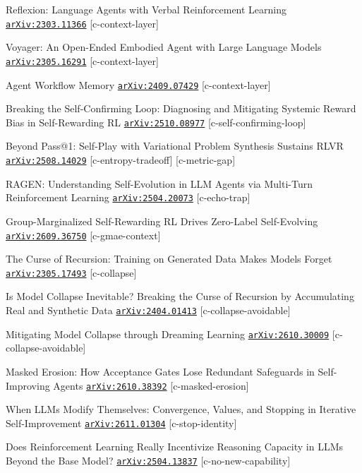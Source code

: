 \begin{refs}
[36] Reflexion: Language Agents with Verbal Reinforcement Learning \href{https://arxiv.org/abs/2303.11366}{\texttt{arXiv:2303.11366}} [c-context-layer]\par
[37] Voyager: An Open-Ended Embodied Agent with Large Language Models \href{https://arxiv.org/abs/2305.16291}{\texttt{arXiv:2305.16291}} [c-context-layer]\par
[38] Agent Workflow Memory \href{https://arxiv.org/abs/2409.07429}{\texttt{arXiv:2409.07429}} [c-context-layer]\par
[39] Breaking the Self-Confirming Loop: Diagnosing and Mitigating Systemic Reward Bias in Self-Rewarding RL \href{https://arxiv.org/abs/2510.08977}{\texttt{arXiv:2510.08977}} [c-self-confirming-loop]\par
[40] Beyond Pass@1: Self-Play with Variational Problem Synthesis Sustains RLVR \href{https://arxiv.org/abs/2508.14029}{\texttt{arXiv:2508.14029}} [c-entropy-tradeoff] [c-metric-gap]\par
[41] RAGEN: Understanding Self-Evolution in LLM Agents via Multi-Turn Reinforcement Learning \href{https://arxiv.org/abs/2504.20073}{\texttt{arXiv:2504.20073}} [c-echo-trap]\par
[42] Group-Marginalized Self-Rewarding RL Drives Zero-Label Self-Evolving \href{https://arxiv.org/abs/2609.36750}{\texttt{arXiv:2609.36750}} [c-gmae-context]\par
[43] The Curse of Recursion: Training on Generated Data Makes Models Forget \href{https://arxiv.org/abs/2305.17493}{\texttt{arXiv:2305.17493}} [c-collapse]\par
[44] Is Model Collapse Inevitable? Breaking the Curse of Recursion by Accumulating Real and Synthetic Data \href{https://arxiv.org/abs/2404.01413}{\texttt{arXiv:2404.01413}} [c-collapse-avoidable]\par
[45] Mitigating Model Collapse through Dreaming Learning \href{https://arxiv.org/abs/2610.30009}{\texttt{arXiv:2610.30009}} [c-collapse-avoidable]\par
[46] Masked Erosion: How Acceptance Gates Lose Redundant Safeguards in Self-Improving Agents \href{https://arxiv.org/abs/2610.38392}{\texttt{arXiv:2610.38392}} [c-masked-erosion]\par
[47] When LLMs Modify Themselves: Convergence, Values, and Stopping in Iterative Self-Improvement \href{https://arxiv.org/abs/2611.01304}{\texttt{arXiv:2611.01304}} [c-stop-identity]\par
[48] Does Reinforcement Learning Really Incentivize Reasoning Capacity in LLMs Beyond the Base Model? \href{https://arxiv.org/abs/2504.13837}{\texttt{arXiv:2504.13837}} [c-no-new-capability]\par

\end{refs}
